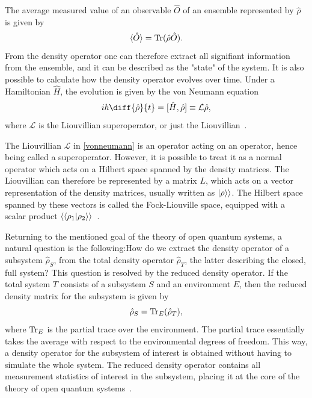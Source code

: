 \documentclass[../main.tex]{subfiles}
\begin{document}
The average measured value of an observable $\hat O$ of an ensemble represented by $\hat\rho$ is given by
\begin{equation}\label{eq:expec}
    \braket{\hat O} = \operatorname{Tr}({\hat\rho \hat O}).
\end{equation}
From the density operator one can therefore extract all signifiant information from the ensemble, and it can be described as the "state" of the system. It is also possible to calculate how the density operator evolves over time. Under a Hamiltonian $\hat H$, the evolution is given by the von Neumann equation
\begin{equation}\label{vonneumann}
    i\hbar\diff{\hat\rho}{t} = [\hat H, \hat\rho] \equiv \mathcal{L}\hat\rho,
\end{equation}
where $\mathcal{L}$ is the Liouvillian superoperator, or just the Liouvillian~\cite{bookopen}. 

The Liouvillian $\mathcal{L}$ in \cref{vonneumann} is an operator acting on an operator, hence being called a superoperator. However, it is possible to treat it as a normal operator which acts on a Hilbert space spanned by the density matrices. The Liouvillian can therefore be represented by a matrix $L$, which acts on a vector representation of the density matrices, usually written as $\ket{\rho}\rangle$. The Hilbert space spanned by these vectors is called the Fock-Liouville space, equipped with a scalar product $\langle\braket{\rho_1|\rho_2}\rangle$~\cite{lindblad}. 

Returning to the mentioned goal of the theory of open quantum systems, a natural question is the following:How do we extract the density operator of a subsystem $\hat\rho_S$, from the total density operator $\hat\rho_T$, the latter describing the closed, full system? This question is resolved by the reduced density operator. If the total system $T$ consists of a subsystem $S$ and an environment $E$, then the reduced density matrix for the subsystem is given by
\begin{equation}
    \hat\rho_S = \operatorname{Tr}_E({\hat\rho_T}),
\end{equation}
where $\operatorname{Tr}_E$ is the partial trace over the environment. The partial trace essentially takes the average with respect to the environmental degrees of freedom. This way, a density operator for the subsystem of interest is obtained without having to simulate the whole system. The reduced density operator contains all measurement statistics of interest in the subsystem, placing it at the core of the theory of open quantum systems~\cite{bookopen}.
\end{document}
